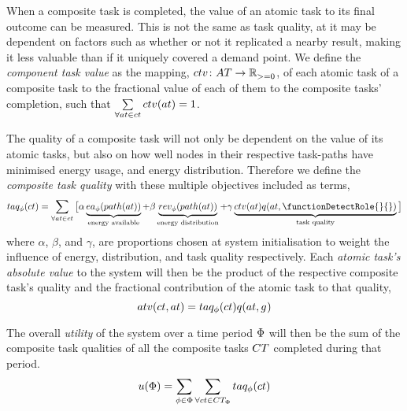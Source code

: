 When a composite task is completed, the value of an atomic task to its final outcome can be measured. This is not the same as task quality, at it may be dependent on factors such as whether or not it replicated a nearby result, making it less valuable than if it uniquely covered a demand point. We define the \textit{component task value} as the mapping, $\formalComponentTaskValue{}{}$,  of each atomic task of a composite task to the fractional value of each of them to the composite tasks' completion, such that $\sum\limits_{\forall \varAtomicTask{}{} \in \varCompositeTask{}{}} \functionComponentTaskValue{}{} = 1$.

The quality of a composite task will not only be dependent on the value of its atomic tasks, but also on how well nodes in their respective task-paths have minimised energy usage, and energy distribution. Therefore we define the \textit{composite task quality} with these multiple objectives included as terms,
\begin{equation}
	\label{eq:ctv}
	\functionCompositeTaskQuality{}{} = 
	\sum\limits_{\forall \varAtomicTask{}{} \in \varCompositeTask{}{}}
	\big\lbrack
	\alpha\underbrace{\functionEnergyAvailable{\functionTaskArc{}{}}{}}_{\text{energy available}}
	+ \beta\underbrace{\functionEnergyVariability{\functionTaskArc{}{}}{}}_{\text{energy distribution}}
	+ 
	\gamma\underbrace{
		\functionComponentTaskValue{}{}
		\functionAtomicTaskQualitySignature{\varAtomicTask{}{}}{\functionDetectRole{}{}}
	}_{\text{task quality}}
\big\rbrack
\end{equation}
where $\alpha$, $\beta$, and $\gamma$, are proportions chosen at system initialisation to weight the influence of energy, distribution, and task quality respectively. Each \textit{atomic task's absolute value} to the system will then be the product of the respective composite task's quality and the fractional contribution of the atomic task to that quality,
\begin{equation}
	\functionTaskAbsoluteValue{}{} = 
	\functionCompositeTaskQuality{}{}
	\functionAtomicTaskQualitySignature{}{}
\end{equation}

The overall \textit{ utility} of the system over a time period $\Phi$ will then be the sum of the composite task qualities of all the composite tasks $\setCompositeTask{}{}$ completed during that period.
	\begin{equation}
		\label{eq:system_utility}
		\functionSystemUtility{}{} = \sum\limits_{\varTime{}{} \in \setTime{}{}}
		\sum\limits_{\forall \varCompositeTask{}{} \in \setCompositeTask{\setTime{}{}}{}}
		\functionCompositeTaskQuality{}{}
	\end{equation}